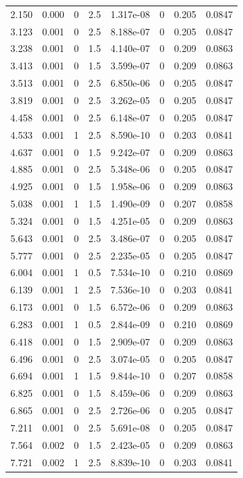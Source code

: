 \documentclass[preview]{standalone}
\begin{document}
{{\begin{tabular}{L{1.2cm}C{1.2cm} C{0.3cm}C{0.5cm} C{1.4cm}C{1.4cm} C{1.4cm}C{1.4cm}}
  2.150  &  0.000  & 0     & 2.5 &  1.317e-08  & 0  & 0.205 &  0.0847   \\ 
  3.123  &  0.001  & 0     & 2.5 &  8.188e-07  & 0  & 0.205 &  0.0847   \\ 
  3.238  &  0.001  & 0     & 1.5 &  4.140e-07  & 0  & 0.209 &  0.0863   \\ 
  3.413  &  0.001  & 0     & 1.5 &  3.599e-07  & 0  & 0.209 &  0.0863   \\ 
  3.513  &  0.001  & 0     & 2.5 &  6.850e-06  & 0  & 0.205 &  0.0847   \\ 
  3.819  &  0.001  & 0     & 2.5 &  3.262e-05  & 0  & 0.205 &  0.0847   \\ 
  4.458  &  0.001  & 0     & 2.5 &  6.148e-07  & 0  & 0.205 &  0.0847   \\ 
  4.533  &  0.001  & 1     & 2.5 &  8.590e-10  & 0  & 0.203 &  0.0841   \\ 
  4.637  &  0.001  & 0     & 1.5 &  9.242e-07  & 0  & 0.209 &  0.0863   \\ 
  4.885  &  0.001  & 0     & 2.5 &  5.348e-06  & 0  & 0.205 &  0.0847   \\ 
  4.925  &  0.001  & 0     & 1.5 &  1.958e-06  & 0  & 0.209 &  0.0863   \\ 
  5.038  &  0.001  & 1     & 1.5 &  1.490e-09  & 0  & 0.207 &  0.0858   \\ 
  5.324  &  0.001  & 0     & 1.5 &  4.251e-05  & 0  & 0.209 &  0.0863   \\ 
  5.643  &  0.001  & 0     & 2.5 &  3.486e-07  & 0  & 0.205 &  0.0847   \\ 
  5.777  &  0.001  & 0     & 2.5 &  2.235e-05  & 0  & 0.205 &  0.0847   \\ 
  6.004  &  0.001  & 1     & 0.5 &  7.534e-10  & 0  & 0.210 &  0.0869   \\ 
  6.139  &  0.001  & 1     & 2.5 &  7.536e-10  & 0  & 0.203 &  0.0841   \\ 
  6.173  &  0.001  & 0     & 1.5 &  6.572e-06  & 0  & 0.209 &  0.0863   \\ 
  6.283  &  0.001  & 1     & 0.5 &  2.844e-09  & 0  & 0.210 &  0.0869   \\ 
  6.418  &  0.001  & 0     & 1.5 &  2.909e-07  & 0  & 0.209 &  0.0863   \\ 
  6.496  &  0.001  & 0     & 2.5 &  3.074e-05  & 0  & 0.205 &  0.0847   \\ 
  6.694  &  0.001  & 1     & 1.5 &  9.844e-10  & 0  & 0.207 &  0.0858   \\ 
  6.825  &  0.001  & 0     & 1.5 &  8.459e-06  & 0  & 0.209 &  0.0863   \\ 
  6.865  &  0.001  & 0     & 2.5 &  2.726e-06  & 0  & 0.205 &  0.0847   \\ 
  7.211  &  0.001  & 0     & 2.5 &  5.691e-08  & 0  & 0.205 &  0.0847   \\ 
  7.564  &  0.002  & 0     & 1.5 &  2.423e-05  & 0  & 0.209 &  0.0863   \\ 
  7.721  &  0.002  & 1     & 2.5 &  8.839e-10  & 0  & 0.203 &  0.0841   \\ 
\hline 
\end{tabular} 

}}
\end{document}
